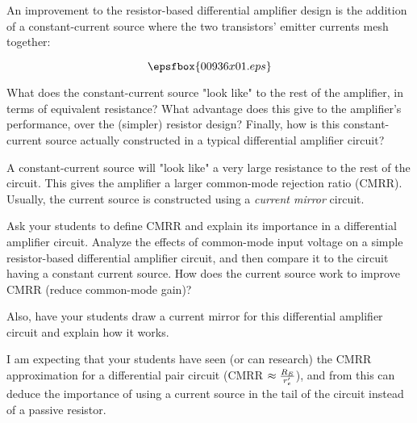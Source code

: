 

An improvement to the resistor-based differential amplifier design is the addition of a constant-current source where the two transistors' emitter currents mesh together:

$$\epsfbox{00936x01.eps}$$

What does the constant-current source "look like" to the rest of the amplifier, in terms of equivalent resistance?  What advantage does this give to the amplifier's performance, over the (simpler) resistor design?  Finally, how is this constant-current source actually constructed in a typical differential amplifier circuit?







A constant-current source will "look like" a very large resistance to the rest of the circuit.  This gives the amplifier a larger common-mode rejection ratio (CMRR).  Usually, the current source is constructed using a {\it current mirror} circuit.







Ask your students to define CMRR and explain its importance in a differential amplifier circuit.  Analyze the effects of common-mode input voltage on a simple resistor-based differential amplifier circuit, and then compare it to the circuit having a constant current source.  How does the current source work to improve CMRR (reduce common-mode gain)?

Also, have your students draw a current mirror for this differential amplifier circuit and explain how it works.

I am expecting that your students have seen (or can research) the CMRR approximation for a differential pair circuit (CMRR $\approx {R_E \over r'_e}$), and from this can deduce the importance of using a current source in the tail of the circuit instead of a passive resistor.




